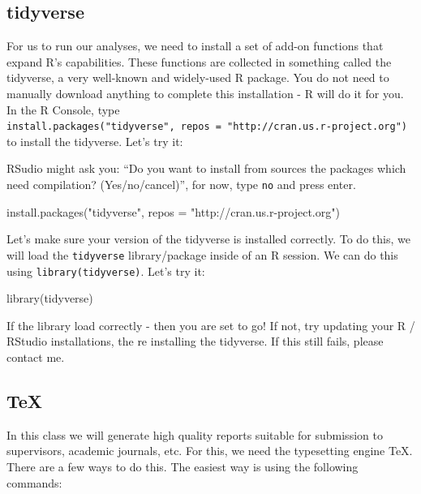 \documentclass[
]{krantz}
\newenvironment{Shaded}{\begin{snugshade}}{\end{snugshade}}
\newcommand{\AttributeTok}[1]{\textcolor[rgb]{0.77,0.63,0.00}{#1}}
\newcommand{\FunctionTok}[1]{\textcolor[rgb]{0.00,0.00,0.00}{#1}}
\newcommand{\NormalTok}[1]{#1}
\newcommand{\StringTok}[1]{\textcolor[rgb]{0.31,0.60,0.02}{#1}}
\begin{document}
\hypertarget{tidyverse}{%
\subsection{tidyverse}\label{tidyverse}}

For us to run our analyses, we need to install a set of add-on functions that expand R's capabilities. These functions are collected in something called the tidyverse, a very well-known and widely-used R package. You do not need to manually download anything to complete this installation - R will do it for you. In the R Console, type \texttt{install.packages("tidyverse",\ repos\ =\ "http://cran.us.r-project.org")} to install the tidyverse. Let's try it:

RSudio might ask you: ``Do you want to install from sources the packages which need compilation? (Yes/no/cancel)'', for now, type \texttt{no} and press enter.

\begin{Shaded}
\begin{Highlighting}[]
\FunctionTok{install.packages}\NormalTok{(}\StringTok{"tidyverse"}\NormalTok{, }\AttributeTok{repos =} \StringTok{"http://cran.us.r{-}project.org"}\NormalTok{)}
\end{Highlighting}
\end{Shaded}

Let's make sure your version of the tidyverse is installed correctly. To do this, we will load the \texttt{tidyverse} library/package inside of an R session. We can do this using \texttt{library(tidyverse)}. Let's try it:

\begin{Shaded}
\begin{Highlighting}[]
\FunctionTok{library}\NormalTok{(tidyverse)}
\end{Highlighting}
\end{Shaded}

If the library load correctly - then you are set to go! If not, try updating your R / RStudio installations, the re installing the tidyverse. If this still fails, please contact me.

\hypertarget{tex}{%
\subsection{TeX}\label{tex}}

In this class we will generate high quality reports suitable for submission to supervisors, academic journals, etc. For this, we need the typesetting engine TeX. There are a few ways to do this. The easiest way is using the following commands:
\end{document}
